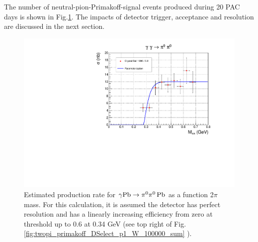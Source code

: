 The number of neutral-pion-Primakoff-signal events produced during 20
PAC days is shown in Fig.\ref{fig:sigma_2pi0_figs_3}. The impacts of
detector trigger, acceptance and resolution are discussed in the next
section.
\begin{figure}[tph]
\centering
\includegraphics[page=3,width=4.75in]{figures/sigma_2pi0_figs.pdf}
\caption{Estimated production rate  for $\gamma \rm{Pb}\rightarrow \pi^0\pi^0\,\rm{Pb}$ as a function 2$\pi$ mass. For this calculation, it is assumed the detector has perfect resolution and has a linearly increasing efficiency from zero at threshold up to 0.6 at 0.34 GeV (see top right of Fig.\,\ref{fig:twopi_primakoff_DSelect_p1_W_100000_sum} ).
\label{fig:sigma_2pi0_figs_3}}
\end{figure}

